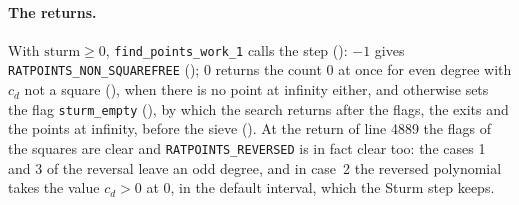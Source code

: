 \paragraph{The returns.} With $\mathrm{sturm} \ge 0$, \verb|find_points_work_1| calls the step
(): $-1$ gives \verb|RATPOINTS_NON_SQUAREFREE|
(); $0$ returns the count $0$ at once for even degree with $c_d$
not a square (), when there is no point at infinity either, and
otherwise sets the flag \verb|sturm_empty| (), by which the
search returns after the flags, the exits and the points at infinity, before the sieve
(). At the return of line 4889 the flags of the squares are clear
and \verb|RATPOINTS_REVERSED| is in fact clear too: the cases 1 and 3 of the reversal leave an odd
degree, and in case~2 the reversed polynomial takes the value $c_d > 0$ at $0$, in the default
interval, which the Sturm step keeps.

